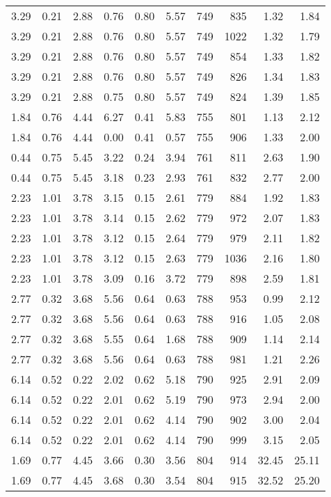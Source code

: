 \begin{longtable}{rrrrrrrrrr}
3.29	&	0.21	&	2.88	&	0.76	&	0.80	&	5.57	&	749	&	835	&	1.32	&	1.84	\\
3.29	&	0.21	&	2.88	&	0.76	&	0.80	&	5.57	&	749	&	1022	&	1.32	&	1.79	\\
3.29	&	0.21	&	2.88	&	0.76	&	0.80	&	5.57	&	749	&	854	&	1.33	&	1.82	\\
3.29	&	0.21	&	2.88	&	0.76	&	0.80	&	5.57	&	749	&	826	&	1.34	&	1.83	\\
3.29	&	0.21	&	2.88	&	0.75	&	0.80	&	5.57	&	749	&	824	&	1.39	&	1.85	\\
1.84	&	0.76	&	4.44	&	6.27	&	0.41	&	5.83	&	755	&	801	&	1.13	&	2.12	\\
1.84	&	0.76	&	4.44	&	0.00	&	0.41	&	0.57	&	755	&	906	&	1.33	&	2.00	\\
0.44	&	0.75	&	5.45	&	3.22	&	0.24	&	3.94	&	761	&	811	&	2.63	&	1.90	\\
0.44	&	0.75	&	5.45	&	3.18	&	0.23	&	2.93	&	761	&	832	&	2.77	&	2.00	\\
2.23	&	1.01	&	3.78	&	3.15	&	0.15	&	2.61	&	779	&	884	&	1.92	&	1.83	\\
2.23	&	1.01	&	3.78	&	3.14	&	0.15	&	2.62	&	779	&	972	&	2.07	&	1.83	\\
2.23	&	1.01	&	3.78	&	3.12	&	0.15	&	2.64	&	779	&	979	&	2.11	&	1.82	\\
2.23	&	1.01	&	3.78	&	3.12	&	0.15	&	2.63	&	779	&	1036	&	2.16	&	1.80	\\
2.23	&	1.01	&	3.78	&	3.09	&	0.16	&	3.72	&	779	&	898	&	2.59	&	1.81	\\
2.77	&	0.32	&	3.68	&	5.56	&	0.64	&	0.63	&	788	&	953	&	0.99	&	2.12	\\
2.77	&	0.32	&	3.68	&	5.56	&	0.64	&	0.63	&	788	&	916	&	1.05	&	2.08	\\
2.77	&	0.32	&	3.68	&	5.55	&	0.64	&	1.68	&	788	&	909	&	1.14	&	2.14	\\
2.77	&	0.32	&	3.68	&	5.56	&	0.64	&	0.63	&	788	&	981	&	1.21	&	2.26	\\
6.14	&	0.52	&	0.22	&	2.02	&	0.62	&	5.18	&	790	&	925	&	2.91	&	2.09	\\
6.14	&	0.52	&	0.22	&	2.01	&	0.62	&	5.19	&	790	&	973	&	2.94	&	2.00	\\
6.14	&	0.52	&	0.22	&	2.01	&	0.62	&	4.14	&	790	&	902	&	3.00	&	2.04	\\
6.14	&	0.52	&	0.22	&	2.01	&	0.62	&	4.14	&	790	&	999	&	3.15	&	2.05	\\
1.69	&	0.77	&	4.45	&	3.66	&	0.30	&	3.56	&	804	&	914	&	32.45	&	25.11	\\
1.69	&	0.77	&	4.45	&	3.68	&	0.30	&	3.54	&	804	&	915	&	32.52	&	25.20	\\

\end{longtable}
